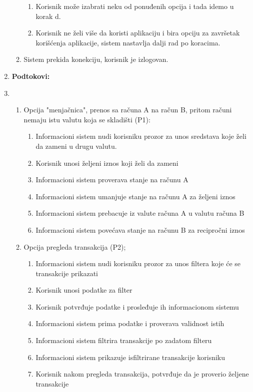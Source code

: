 \documentclass{article}
\begin{document}
\begin{enumerate}
\begin{enumerate}
      \begin{enumerate}
        \item Korisnik može izabrati neku od ponuđenih opcija i tada idemo u korak d.
        \item Korisnik ne želi više da koristi aplikaciju i bira opciju za završetak korišćenja aplikacije, sistem nastavlja dalji rad po koracima.
      \end{enumerate}
      \item Sistem prekida konekciju, korisnik je izlogovan.
    \end{enumerate}
  \item \textbf{Podtokovi: } 
    \item \begin{enumerate}
     
      \item Opcija "menjačnica", prenos sa računa A na račun B, pritom računi nemaju istu valutu koja se skladišti (P1):
        
      \begin{enumerate}
          \item Informacioni sistem nudi korisniku prozor za unos sredstava koje želi da zameni u drugu valutu.
          \item Korisnik unosi željeni iznos koji želi da zameni
          \item Informacioni sistem proverava stanje na računu A 
          \item Informacioni sistem umanjuje stanje na računu A za željeni iznos  
          \item Informacioni sistem prebacuje iz valute računa A u valutu računa B
          \item Informacioni sistem povećava stanje na računu B za recipročni iznos
        \end{enumerate}
        
        \item Opcija pregleda transakcija (P2);
        
        \begin{enumerate}
          \item Informacioni sistem nudi korisniku prozor za unos filtera koje će se transakcije prikazati
          \item Korisnik unosi podatke za filter
          \item Korisnik potvrđuje podatke i prosleđuje ih informacionom sistemu
          \item Informacioni sistem prima podatke i proverava validnost istih
          \item Informacioni sistem filtrira transakcije po zadatom filteru
          \item Informacioni sistem prikazuje isfiltrirane transakcije korisniku
          \item Korisnik nakom pregleda transakcija, potvrđuje da je proverio željene transakcije
        \end{enumerate}


\end{enumerate}
\end{enumerate}
\end{document}

